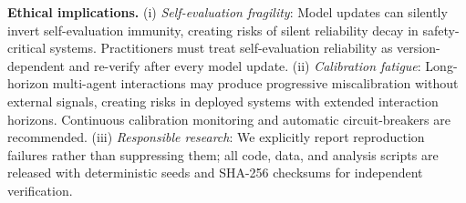 \documentclass[11pt]{article}
\begin{document}
\textbf{Ethical implications.} (i) \textit{Self-evaluation fragility}: Model updates can silently invert self-evaluation immunity, creating risks of silent reliability decay in safety-critical systems. Practitioners must treat self-evaluation reliability as version-dependent and re-verify after every model update. (ii) \textit{Calibration fatigue}: Long-horizon multi-agent interactions may produce progressive miscalibration without external signals, creating risks in deployed systems with extended interaction horizons. Continuous calibration monitoring and automatic circuit-breakers are recommended. (iii) \textit{Responsible research}: We explicitly report reproduction failures rather than suppressing them; all code, data, and analysis scripts are released with deterministic seeds and SHA-256 checksums for independent verification.
\end{document}
